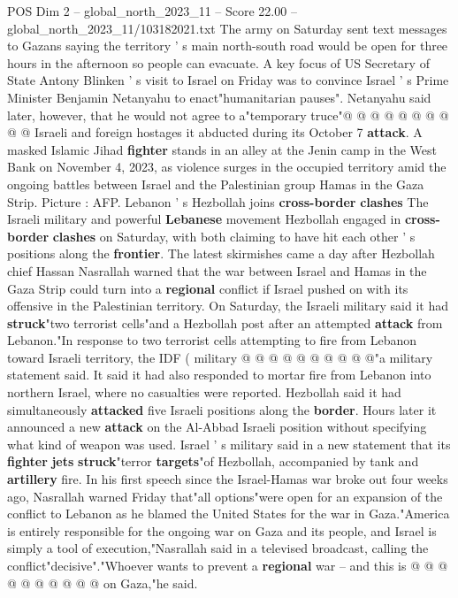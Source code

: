 \begin{textsample}{POS Dim 2 – global\_north\_2023\_11 – Score 22.00 – global\_north\_2023\_11/103182021.txt}
The army on Saturday sent text messages to Gazans saying the territory ' s main north-south road would be open for three hours in the afternoon so people can evacuate.
A key focus of US Secretary of State Antony Blinken ' s visit to Israel on Friday was to convince Israel ' s Prime Minister Benjamin Netanyahu to enact"humanitarian pauses".
Netanyahu said later, however, that he would not agree to a"temporary truce"@ @ @ @ @ @ @ @ @ @ Israeli and foreign hostages it abducted during its October 7 \textbf{attack}.
A masked Islamic Jihad \textbf{fighter} stands in an alley at the Jenin camp in the West Bank on November 4, 2023, as violence surges in the occupied territory amid the ongoing battles between Israel and the Palestinian group Hamas in the Gaza Strip.
Picture : AFP.
Lebanon ' s Hezbollah joins \textbf{cross-border} \textbf{clashes} The Israeli military and powerful \textbf{Lebanese} movement Hezbollah engaged in \textbf{cross-border} \textbf{clashes} on Saturday, with both claiming to have hit each other ' s positions along the \textbf{frontier}.
The latest skirmishes came a day after Hezbollah chief Hassan Nasrallah warned that the war between Israel and Hamas in the Gaza Strip could turn into a \textbf{regional} conflict if Israel pushed on with its offensive in the Palestinian territory.
On Saturday, the Israeli military said it had \textbf{struck}"two terrorist cells"and a Hezbollah post after an attempted \textbf{attack} from Lebanon."In response to two terrorist cells attempting to fire from Lebanon toward Israeli territory, the IDF ( military @ @ @ @ @ @ @ @ @ @"a military statement said.
It said it had also responded to mortar fire from Lebanon into northern Israel, where no casualties were reported.
Hezbollah said it had simultaneously \textbf{attacked} five Israeli positions along the \textbf{border}.
Hours later it announced a new \textbf{attack} on the Al-Abbad Israeli position without specifying what kind of weapon was used.
Israel ' s military said in a new statement that its \textbf{fighter} \textbf{jets} \textbf{struck}"terror \textbf{targets}"of Hezbollah, accompanied by tank and \textbf{artillery} fire.
In his first speech since the Israel-Hamas war broke out four weeks ago, Nasrallah warned Friday that"all options"were open for an expansion of the conflict to Lebanon as he blamed the United States for the war in Gaza."America is entirely responsible for the ongoing war on Gaza and its people, and Israel is simply a tool of execution,"Nasrallah said in a televised broadcast, calling the conflict"decisive"."Whoever wants to prevent a \textbf{regional} war -- and this is @ @ @ @ @ @ @ @ @ @ on Gaza,"he said.

\end{textsample}
